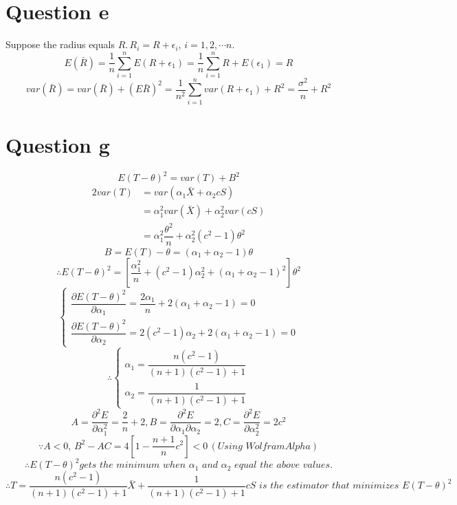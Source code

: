 \documentclass[a4papers]{ctexart}
\begin{document}
\section*{Question e}
Suppose the radius equals $R$.\,$R_i = R+\epsilon_i,\,i=1,2,\cdots n.$
\[ E(\bar{R}) =\dfrac{1}{n}\sum_{i=1}^n E(R+\epsilon_1) = \dfrac{1}{n}\sum_{i=1}^n R+E(\epsilon_1) = R\]
\[ var(\bar{R}) = var(\bar{R})+(E\bar{R})^2 = \dfrac{1}{n^2}\sum_{i=1}^n var(R+\epsilon_1) + R^2 =\dfrac{\sigma^2}{n}+R^2\] 

\section*{Question g}
\[E\left( T-\theta \right) ^{2}=var\left( T\right) +B^{2}\]
\begin{alignat*}{2}
    var(T) &= var(\alpha_1\bar{X}+\alpha_2cS)\\
        &= \alpha_1^2var(\bar{X})+\alpha_2^2var(cS)\\
        &= \alpha_1^2\dfrac{\theta^2}{n}+\alpha_2^2(c^2-1)\theta^2
\end{alignat*}
\[B=E(T)-\theta=(\alpha_1+\alpha_2-1)\theta\]
\[\therefore E\left( T-\theta \right) ^{2} = \left[ \dfrac {\alpha ^{2}_{1}}{n}+\left( c^{2}-1\right) \alpha ^{2}_{2}+\left( \alpha _{1}+\alpha _{2}-1\right) ^{2}\right] \theta ^{2} \]
\begin{equation*}
\begin{cases}
    \dfrac {\partial E\left( T-\theta \right) ^{2}}{\partial \alpha _{1}}=\dfrac {2\alpha _{1}}{n}+2\left( \alpha _{1}+\alpha _{2}-1\right) =0 \\
    \dfrac {\partial E\left( T-\theta \right) ^{2}}{\partial \alpha _{2}}=2\left( c^{2}-1\right) \alpha _{2}+2\left( \alpha _{1}+\alpha _{2}-1\right) =0
\end{cases}
\end{equation*}
\begin{equation*}
    \therefore \begin{cases}
        \alpha_1 = \dfrac{n(c^2-1)}{(n+1)(c^2-1)+1}\\
        \alpha_2 = \dfrac{1}{(n+1)(c^2-1)+1}
    \end{cases}
\end{equation*}
\[A=\dfrac {\partial ^{2}E}{\partial \alpha_1^2}=\dfrac {2}{n}+2,B=\dfrac {\partial ^{2}E}{\partial \alpha _{1}\partial \alpha _{2}}=2,C=\dfrac {\partial ^{2}E}{\partial \alpha ^{2}_{2}}=2c^{2}\]
\[\because A<0,\,B^2-AC=4\left[1-\dfrac{n+1}{n}c^2\right]<0 \,(Using\,\, WolframAlpha) \]
\[\therefore E\left( T-\theta \right) ^{2} gets\,\, the\,\, minimum \,\,when\,\, \alpha_1\,\, and \,\,\alpha_2 \,\,equal\,\, the\,\, above\,\, values.\]
\[\therefore T=\dfrac{n(c^2-1)}{(n+1)(c^2-1)+1}\bar{X} + \dfrac{1}{(n+1)(c^2-1)+1}cS\,\, is\,\, the\,\, estimator\,\, that\,\, minimizes\,\, E\left( T-\theta \right) ^{2}\]
\end{document}
